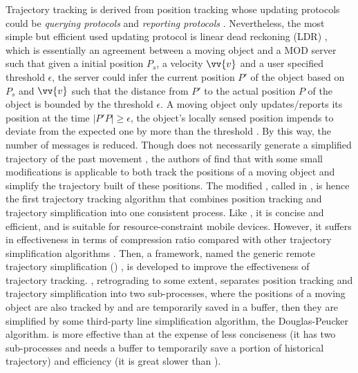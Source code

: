 Trajectory tracking is derived from position tracking whose updating protocols could be \emph{querying protocols} and \emph{reporting protocols} \cite{Leonhardi:Comparison}. Nevertheless, the most simple but efficient used updating protocol is linear dead reckoning (LDR) \cite{Leonhardi:Comparison,Civilis:Techniques,Wolfson:PositionTracking}, which is essentially an agreement between a moving object and a MOD server such that given a initial position $P_s$, a velocity $\vv{v}$ and a user specified threshold $\epsilon$, the server could infer the current position $P'$ of the object based on $P_s$ and $\vv{v}$ such that the distance from $P'$ to the actual position $P$ of the object is bounded by the threshold $\epsilon$. A moving object only updates/reports its position at the time $|P'P| \ge \epsilon$, \ie the object's locally sensed position impends to deviate from the expected one by more than the threshold \cite{Lange:Tracking}. By this way, the number of messages is reduced.
%
Though \ldr does not necessarily generate a simplified trajectory of the past movement \cite{Lange:Tracking}, the authors of \cite{Trajcevski:LDRH} find that \ldr with some small modifications is applicable to both track the positions of a moving object and simplify the trajectory built of these positions. The modified \ldr,  called \ldrh in \cite{Lange:Tracking}, is hence the first trajectory tracking algorithm that combines position tracking and trajectory simplification into one consistent process. Like \ldr, it is concise and efficient, and is suitable for resource-constraint mobile devices. However, it suffers in effectiveness in terms of compression ratio compared with other trajectory simplification algorithms \cite{Douglas:Peucker, Lin:Cised}. %
%
Then, a framework, named the generic remote trajectory simplification (\grts) \cite{Lange:GRTS,Lange:Tracking}, is developed to improve the effectiveness of trajectory tracking. \grts, retrograding to some extent, separates position tracking and trajectory simplification into two sub-processes, where the positions of a moving object are also tracked by \ldr and are temporarily saved in a buffer, then they are simplified by some third-party line simplification algorithm, \eg the Douglas-Peucker \cite{Douglas:Peucker} algorithm. \grts is more effective than \ldrh at the expense of less conciseness (it has two sub-processes and needs a buffer to temporarily save a portion of historical trajectory) and efficiency (it is great slower than \ldrh).
%



